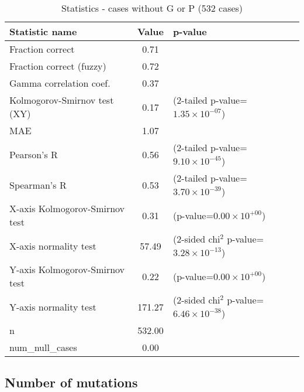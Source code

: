 \documentclass[10pt, letterpaper, oneside, titlepage, landscape]{scrreprt}
\begin{document}
\begin{table}[H]\begin{center}
\begin{tabular}{ l S[table-format=3.2] l}
Statistic name & {Value} & p-value\\
\hline
Fraction correct & 0.71 & \\
Fraction correct (fuzzy) & 0.72 & \\
Gamma correlation coef. & 0.37 & \\
Kolmogorov-Smirnov test (XY) & 0.17 & (2-tailed p-value=$1.35\times10^{-07}$)\\
MAE & 1.07 & \\
Pearson's R & 0.56 & (2-tailed p-value=$9.10\times10^{-45}$)\\
Spearman's R & 0.53 & (2-tailed p-value=$3.70\times10^{-39}$)\\
X-axis Kolmogorov-Smirnov test & 0.31 & (p-value=$0.00\times10^{+00}$)\\
X-axis normality test & 57.49 & (2-sided chi$^{2}$ p-value=$3.28\times10^{-13}$)\\
Y-axis Kolmogorov-Smirnov test & 0.22 & (p-value=$0.00\times10^{+00}$)\\
Y-axis normality test & 171.27 & (2-sided chi$^{2}$ p-value=$6.46\times10^{-38}$)\\
n & 532.00 & \\
num\_null\_cases & 0.00 & \\
\end{tabular}
\caption{Statistics - cases without G or P (532 cases)}
\end{center}\end{table}


\subsection{Number of mutations}
\end{document}
